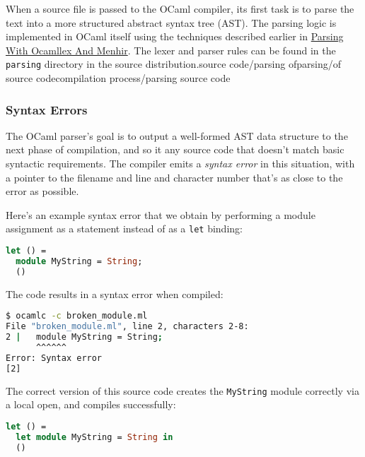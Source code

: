 When a source file is passed to the OCaml compiler, its first task is to
parse the text into a more structured abstract syntax tree (AST). The
parsing logic is implemented in OCaml itself using the techniques
described earlier in
\href{parsing-with-ocamllex-and-menhir.html\#parsing-with-ocamllex-and-menhir}{Parsing
With Ocamllex And Menhir}. The lexer and parser rules can be found in
the \passthrough{\lstinline!parsing!} directory in the source
distribution.\protect\hypertarget{SCpras}{}{source
code/parsing of}\protect\hypertarget{PARSsource}{}{parsing/of source
code}\protect\hypertarget{CPpars}{}{compilation process/parsing source
code}

\hypertarget{syntax-errors}{%
\subsubsection{Syntax Errors}\label{syntax-errors}}

The OCaml parser's goal is to output a well-formed AST data structure to
the next phase of compilation, and so it any source code that doesn't
match basic syntactic requirements. The compiler emits a \emph{syntax
error} in this situation, with a pointer to the filename and line and
character number that's as close to the error as
possible.

Here's an example syntax error that we obtain by performing a module
assignment as a statement instead of as a \passthrough{\lstinline!let!}
binding:

\begin{lstlisting}[language=Caml]
let () =
  module MyString = String;
  ()
\end{lstlisting}

The code results in a syntax error when compiled:

\begin{lstlisting}[language=bash]
$ ocamlc -c broken_module.ml
File "broken_module.ml", line 2, characters 2-8:
2 |   module MyString = String;
      ^^^^^^
Error: Syntax error
[2]
\end{lstlisting}

The correct version of this source code creates the
\passthrough{\lstinline!MyString!} module correctly via a local open,
and compiles successfully:

\begin{lstlisting}[language=Caml]
let () =
  let module MyString = String in
  ()
\end{lstlisting}

